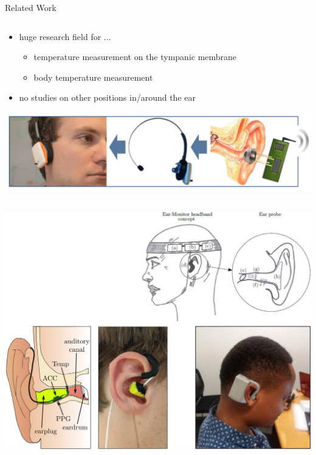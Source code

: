 \documentclass[en]{sdqbeamer}
\begin{document}
\begin{frame}[fragile]{Related Work}
\begin{column}{0.47\textwidth}
        \begin{itemize}
        \item huge research field for ...
        \begin{itemize}
            \item temperature measurement on the tympanic membrane
            \item body temperature measurement
        \end{itemize}
        \item no studies on other positions in/around the ear
    \end{itemize}
    \vspace{1cm}
    \includegraphics[scale=0.26]{proposal-presentation/images/relatedWork/relatedWork3.png}
    \end{column}
    \begin{column}{0.43\textwidth}
    \vspace{-0.4cm}
        \includegraphics[scale=0.19]{proposal-presentation/images/relatedWork/relatedWorkMerged2.png}
    \end{column}
\end{frame}
\end{document}
